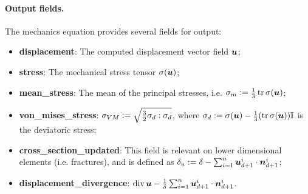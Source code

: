 \paragraph{Output fields.}
The mechanics equation provides several fields for output:
\begin{itemize}
    \item \textbf{displacement}: The computed displacement vector field $\mathbf{\boldsymbol{u}}$;
    \item \textbf{stress}: The mechanical stress tensor ${\mathbb{\sigma}}(\mathbf{\boldsymbol{u}})$;
    \item \textbf{mean\_stress}: The mean of the principal stresses, i.e. $\sigma_m:=\frac13\operatorname{tr}{\mathbb{\sigma}}(\mathbf{\boldsymbol{u}})$;
    \item \textbf{von\_mises\_stress}: $\sigma_{VM}:=\sqrt{\frac32{\mathbb{\sigma}}_d:{\mathbb{\sigma}}_d}$, where ${\mathbb{\sigma}}_d:={\mathbb{\sigma}}(\mathbf{\boldsymbol{u}})-\frac13(\operatorname{tr}{\mathbb{\sigma}}(\mathbf{\boldsymbol{u}})){\mathbb{I}}$ is the deviatoric stress;
    \item \textbf{cross\_section\_updated}: This field is relevant on lower dimensional elements (i.e. fractures), and is defined as $\delta_u:=\delta-\sum_{i=1}^n\mathbf{\boldsymbol{u}}^i_{d+1}\cdot\mathbf{\boldsymbol{n}}^i_{d+1}$;
    \item \textbf{displacement\_divergence}: $\operatorname{div}\mathbf{\boldsymbol{u}}-\frac1\delta\sum_{i=1}^n\mathbf{\boldsymbol{u}}^i_{d+1}\cdot\mathbf{\boldsymbol{n}}^i_{d+1}$.
\end{itemize}

